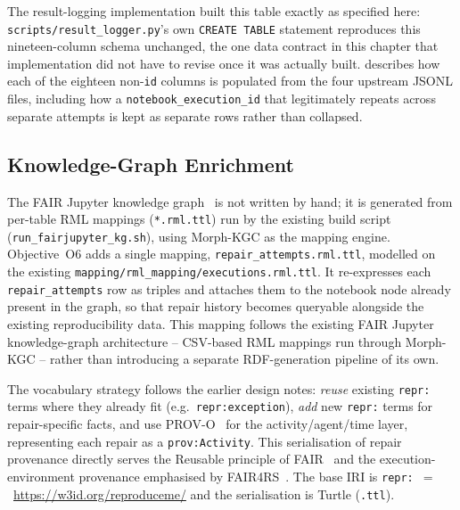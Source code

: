 The result-logging implementation built this table exactly as specified here:
\texttt{scripts/result\_logger.py}'s own \texttt{CREATE TABLE} statement
reproduces this nineteen-column schema unchanged, the one data contract in
this chapter that implementation did not have to revise once it was actually
built.  describes how each of the eighteen
non-\texttt{id} columns is populated from the four upstream JSONL files,
including how a \texttt{notebook\_execution\_id} that legitimately repeats
across separate attempts is kept as separate rows rather than collapsed.

\subsection{Knowledge-Graph Enrichment}
\label{subsec:kg}

The FAIR Jupyter knowledge graph~\cite{samuel2024fairkg}
is not written by hand; it is generated from per-table RML mappings
(\texttt{*.rml.ttl}) run by the existing build script
(\texttt{run\_fairjupyter\_kg.sh}), using Morph-KGC as the mapping engine.
Objective~O6 adds a single mapping, \texttt{repair\_attempts.rml.ttl},
modelled on the existing \texttt{mapping/rml\_mapping/executions.rml.ttl}. It
re-expresses each \texttt{repair\_attempts} row as triples and attaches them
to the notebook node already present in the graph, so that repair history
becomes queryable alongside the existing reproducibility data. This mapping
follows the existing FAIR Jupyter knowledge-graph architecture -- CSV-based
RML mappings run through Morph-KGC -- rather than introducing a separate
RDF-generation pipeline of its own.

The vocabulary strategy follows the earlier design notes: \emph{reuse} existing
\texttt{repr:} terms where they already fit (e.g.\ \texttt{repr:exception}),
\emph{add} new \texttt{repr:} terms for repair-specific facts, and use
PROV-O~\cite{provenance2013}
for the activity/agent/time layer, representing each repair as a
\texttt{prov:Activity}. This serialisation of repair provenance directly
serves the Reusable principle of FAIR~\cite{wilkinson2016fair} and the
execution-environment provenance emphasised by
FAIR4RS~\cite{barker2022fair4rs}.
The base IRI is \texttt{repr:}~$=$~\url{https://w3id.org/reproduceme/} and
the serialisation is Turtle (\texttt{.ttl}).

